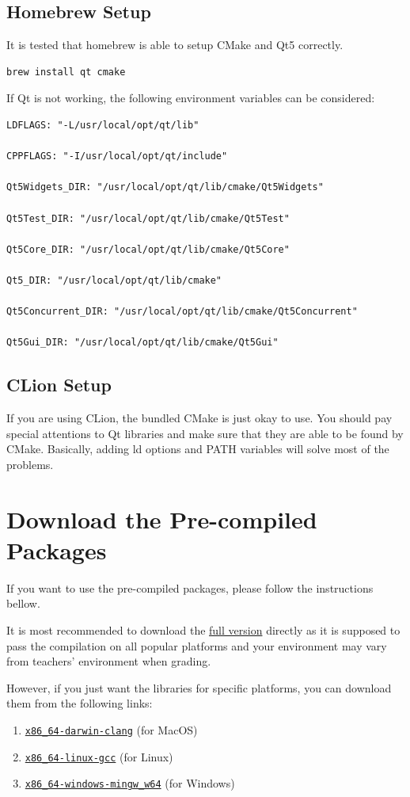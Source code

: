 \documentclass[a4paper,12pt]{report}
\begin{document}
\subsection{Homebrew Setup}
It is tested that homebrew is able to setup CMake and Qt5 correctly.  
\begin{verbatim}
brew install qt cmake
\end{verbatim}
If Qt is not working, the following environment variables can be considered:
\begin{verbatim}
LDFLAGS: "-L/usr/local/opt/qt/lib"

CPPFLAGS: "-I/usr/local/opt/qt/include"

Qt5Widgets_DIR: "/usr/local/opt/qt/lib/cmake/Qt5Widgets"

Qt5Test_DIR: "/usr/local/opt/qt/lib/cmake/Qt5Test"

Qt5Core_DIR: "/usr/local/opt/qt/lib/cmake/Qt5Core"

Qt5_DIR: "/usr/local/opt/qt/lib/cmake"

Qt5Concurrent_DIR: "/usr/local/opt/qt/lib/cmake/Qt5Concurrent"

Qt5Gui_DIR: "/usr/local/opt/qt/lib/cmake/Qt5Gui"
\end{verbatim}

\subsection{CLion Setup}
If you are using CLion, the bundled CMake is just okay to use. You should pay special attentions to Qt libraries and make sure that they are able to be found by CMake. Basically, adding ld options and PATH variables will solve most of the problems.
\section{Download the Pre-compiled Packages}
If you want to use the pre-compiled packages, please follow the instructions bellow.

It is most recommended to download the \href{https://github.com/SchrodingerZhu/StanfordLib-CUHKSZ/releases/download/2020.1/x86_64-full.zip}{full version} directly as it is supposed to pass the compilation on all popular platforms and your environment may vary from teachers' environment when grading.

However, if you just want the libraries for specific platforms, you can download them from the following links:
\begin{enumerate}
	\item \href{https://github.com/SchrodingerZhu/StanfordLib-CUHKSZ/releases/download/2020.1/x86_64-darwin-clang.zip} {\texttt{x86_64-darwin-clang}} (for MacOS)
	\item 
	\href{https://github.com/SchrodingerZhu/StanfordLib-CUHKSZ/releases/download/2020.1/x86_64-linux-gcc.zip} {\texttt{x86_64-linux-gcc}} (for Linux)
	\item
	\href{https://github.com/SchrodingerZhu/StanfordLib-CUHKSZ/releases/download/2020.1/x86_64-windows-mingw_w64.zip} {\texttt{x86_64-windows-mingw_w64}} (for Windows)
\end{enumerate}
\end{document}
